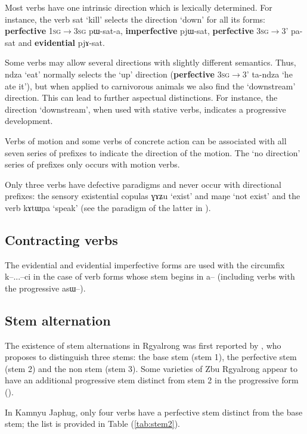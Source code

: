 \documentclass[oldfontcommands,oneside,a4paper,11pt]{article}
\newcommand{\ipa}[1]{{\phon \mbox{#1}}} %
\newcommand{\refb}[1]{(\ref{#1})}
\begin{document}
Most verbs have one intrinsic direction which is lexically determined. For instance, the verb \ipa{sat} `kill' selects the direction `down' for all its forms: \textbf{perfective} \textsc{1sg$\rightarrow$3sg} \ipa{pɯ-sat-a}, \textbf{imperfective} \ipa{pjɯ-sat}, \textbf{perfective} \textsc{3sg$\rightarrow$3'} \ipa{pa-sat} and \textbf{evidential} \ipa{pjɤ-sat}. 

Some verbs may allow several directions with slightly different semantics. Thus, \ipa{ndza} `eat'   normally   selects the  `up' direction (\textbf{perfective} \textsc{3sg$\rightarrow$3'} \ipa{ta-ndza} `he ate it'), but when applied to carnivorous animals we also find the `downstream' direction. This can lead to further aspectual distinctions. For instance, the direction `downstream', when used with stative verbs, indicates a progressive development. 

Verbs of motion and some verbs of concrete action can be associated with all seven series of prefixes to indicate the direction of the motion. The  `no direction' series of prefixes only occurs with motion verbs. 

Only three verbs have defective paradigms and never occur with directional prefixes: the sensory existential copulas \ipa{ɣɤʑu} `exist' and \ipa{maŋe} `not exist' and the verb \ipa{kɤtɯpa} `speak' (see the paradigm of the latter in \citealt[1215]{jacques12incorp}).

\subsection{Contracting verbs}

\citet{jacques07passif}
The evidential and evidential imperfective forms are used with the circumfix \ipa{k--}...\ipa{--ci} in the case of verb forms whose stem begins in \ipa{a--} (including verbs with the progressive \ipa{asɯ--}).

\subsection{Stem alternation} \label{sec:stem}
The existence of stem alternations in Rgyalrong was first reported by \citet{jackson00puxi}, who proposes to distinguish three stems: the base stem (stem 1), the perfective stem (stem 2) and the non stem (stem 3). Some varieties of Zbu Rgyalrong appear to have an additional progressive stem distinct from stem 2 in the progressive form (\citealt[352]{jacques04these}).


In Kamnyu Japhug, only four verbs have a   perfective stem distinct from the base stem; the list is provided in Table \refb{tab:stem2}. 
\end{document}
